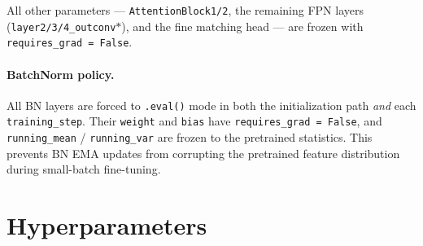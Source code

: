 \documentclass[11pt]{article}
\begin{document}
All other parameters --- \texttt{AttentionBlock1/2}, the remaining FPN
layers (\texttt{layer2/3/4\_outconv$*$}), and the fine matching head ---
are frozen with \texttt{requires\_grad = False}.

\paragraph{BatchNorm policy.} All BN layers are forced to
\texttt{.eval()} mode in both the initialization path \emph{and} each
\texttt{training\_step}. Their \texttt{weight} and \texttt{bias} have
\texttt{requires\_grad = False}, and \texttt{running\_mean} /
\texttt{running\_var} are frozen to the pretrained statistics. This
prevents BN EMA updates from corrupting the pretrained feature
distribution during small-batch fine-tuning.

\section{Hyperparameters}
\end{document}
